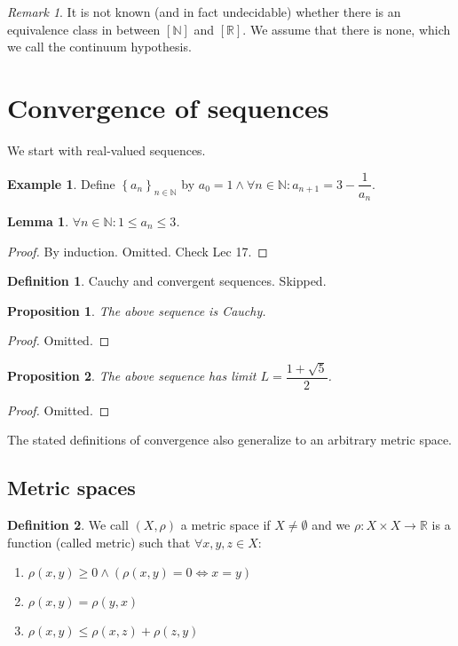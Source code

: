 \documentclass{article}
\newcommand\N{\ensuremath{\mathbb{N}}}
\newcommand\R{\ensuremath{\mathbb{R}}}
\renewcommand\O{\ensuremath{\emptyset}}
\newtheorem{lemma}[theorem]{Lemma}
\theoremstyle{definition}
\newtheorem{definition}{Definition}[subsection]
\newtheorem{eg}{Example}[subsection]
\theoremstyle{remark}
\newtheorem*{remark}{Remark}
\theoremstyle{plain}
\newtheorem{prop}{Proposition}[subsection]
\begin{document}
\begin{remark}
    It is not known (and in fact undecidable) whether there is an equivalence class in between \([\N]\) and \([\R]\). We assume that there is none, which we call the continuum hypothesis.
\end{remark}

\section{Convergence of sequences}

We start with real-valued sequences. 


\begin{eg}
    Define \(\left\{ a_n \right\}_{n \in \N}\) by \(a_0 = 1 \land \forall n \in \N: a_{n+1} = 3 - \dfrac{1}{a_n}\).
    \begin{lemma}
        \(\forall n \in \N: 1 \leq a_n \leq 3\).
    \end{lemma}
    \begin{proof}
        By induction. Omitted. Check Lec 17.
    \end{proof}
\end{eg}

\begin{definition}
    Cauchy and convergent sequences. Skipped. 
\end{definition}

\begin{prop}
    The above sequence is Cauchy. 
\end{prop}
\begin{proof}
    Omitted. 
\end{proof}

\begin{prop}
    The above sequence has limit \(L = \dfrac{1+ \sqrt{5}}{2}\).
\end{prop}
\begin{proof}
    Omitted. 
\end{proof}

The stated definitions of convergence also generalize to an arbitrary metric space. 

\subsection{Metric spaces}

\begin{definition}
    We call \((X, \rho)\) a metric space if \(X\neq \O\) and we \(\rho: X\times X \to \R\) is a function (called metric) such that \(\forall x,y,z \in X\):
    \begin{enumerate}
        \item \(\rho(x,y) \geq 0 \land (\rho(x,y) = 0 \iff x = y)\)
        \item \(\rho(x,y) = \rho(y,x)\)
        \item \(\rho(x,y)\leq \rho(x,z) + \rho(z,y)\)
    \end{enumerate}
\end{definition}
\end{document}
